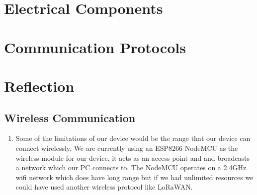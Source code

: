 \documentclass[12pt, titlepage]{article}
\begin{document}
\section{Electrical Components}

\section{Communication Protocols}


\newpage
\section{Reflection}
\subsection{Wireless Communication}
\begin{enumerate}
  \item Some of the limitations of our device would be the range that our device can connect wirelessly. We are currently using an ESP8266 NodeMCU as the wireless module for our device, it acts as an access point and and broadcasts a network which our PC connects to. The NodeMCU operates on a 2.4GHz wifi network which does have long range but if we had unlimited resources we could have used another wireless protocol like LoRaWAN.
  
\end{enumerate}
\end{document}
